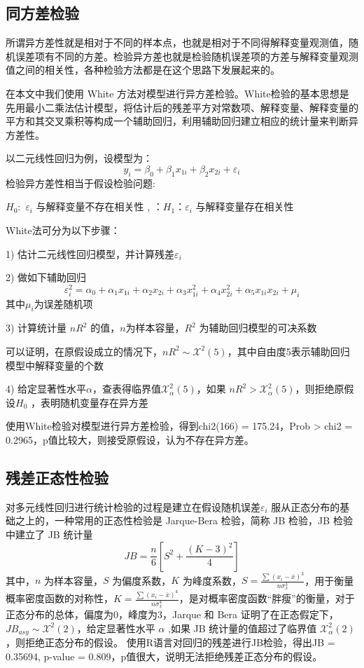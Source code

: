 \documentclass [a4paper]{article}
\begin{document}
\subsection{同方差检验}

所谓异方差性就是相对于不同的样本点，也就是相对于不同得解释变量观测值，随机误差项有不同的方差。检验异方差也就是检验随机误差项的方差与解释变量观测值之间的相关性，各种检验方法都是在这个思路下发展起来的。

在本文中我们使用 White 方法对模型进行异方差检验。White检验的基本思想是先用最小二乘法估计模型，将估计后的残差平方对常数项、解释变量、解释变量的平方和其交叉乘积等构成一个辅助回归，利用辅助回归建立相应的统计量来判断异方差性。

以二元线性回归为例，设模型为：
$$
y_i = \beta_0 +\beta_1x_{1i}+\beta_2x_{2i}+\varepsilon_i
$$
检验异方差性相当于假设检验问题:

$H_0:$ $\varepsilon_i$ 与解释变量不存在相关性 ,  $：H_1：$ ​ $\varepsilon_i$ 与解释变量存在相关性

White法可分为以下步骤：

1) 估计二元线性回归模型，并计算残差$\varepsilon_i$

2) 做如下辅助回归
$$
\varepsilon_i^2 = \alpha_0 +\alpha_1x_{1i}+\alpha_2x_{2i}+\alpha_3x_{1i}^2+\alpha_4x_{2i}^2+\alpha_5x_{1i}x_{2i}+\mu_i
$$
其中$\mu_i$为误差随机项

3) 计算统计量 $nR^2$ 的值，$n$为样本容量，$R^2$ 为辅助回归模型的可决系数

可以证明，在原假设成立的情况下，$nR^2 \sim \mathcal{X}^2(5)$，其中自由度5表示辅助回归模型中解释变量的个数

4) 给定显著性水平$\alpha$，查表得临界值$\mathcal{X}_\alpha^2(5)$，如果 $nR^2>\mathcal{X}_\alpha^2(5)$，则拒绝原假设$H_0$ ，表明随机变量存在异方差

使用White检验对模型进行异方差检验，得到chi2(166)    =    175.24，Prob > chi2  =    0.2965，p值比较大，则接受原假设，认为不存在异方差。
\subsection{残差正态性检验}


对多元线性回归进行统计检验的过程是建立在假设随机误差$\varepsilon_i$ 服从正态分布的基础之上的，一种常用的正态性检验是 Jarque-Bera 检验，简称 JB 检验，JB 检验中建立了 JB 统计量
$$
JB = \frac{n}{6}[S^2 + \frac{(K-3)^2}{4}]
$$
其中，$n$ 为样本容量，$S$ 为偏度系数，$K$ 为峰度系数，$S = \frac{\sum(x_i -\bar{x})^3}{n\sigma_x^3}$，用于衡量概率密度函数的对称性，$K=\frac{\sum(x_i-\bar{x})^4}{n\sigma_x^4}$，是对概率密度函数“胖瘦”的衡量，对于正态分布的总体，偏度为0，峰度为3，Jarque 和 Bera 证明了在正态假定下，$JB_{asy} \sim \mathcal{X}^2(2)$，给定显著性水平 $\alpha$ ,如果 JB 统计量的值超过了临界值 $\mathcal{X}^2_\alpha(2)$，则拒绝正态分布的假设。
使用R语言对回归的残差进行JB检验，得出JB = 0.35694, p-value = 0.809，p值很大，说明无法拒绝残差正态分布的假设。
\end{document}
